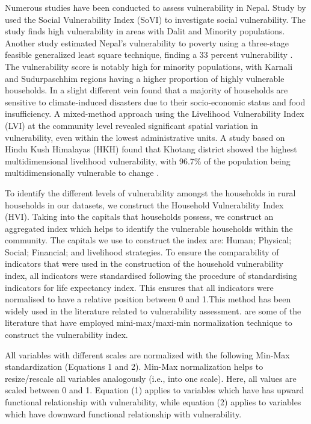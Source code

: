 Numerous studies have been conducted to assess vulnerability in Nepal. Study by \cite{aksha2019analysis} used the Social Vulnerability Index (SoVI) to investigate social vulnerability. The study finds high vulnerability in areas with Dalit and Minority populations. Another study estimated Nepal's vulnerability to poverty using a three-stage feasible generalized least square technique, finding a 33 percent vulnerability \citep{shahiestimating}. The vulnerability score is notably high for minority populations, with Karnali and Sudurpaschhim regions having a higher proportion of highly vulnerable households. In a slight different vein \cite{bista2019grasping} found that a majority of households are sensitive to climate-induced disasters due to their socio-economic status and food insufficiency. A mixed-method approach using the Livelihood Vulnerability Index (LVI) at the community level revealed significant spatial variation in vulnerability, even within the lowest administrative units. A study based on Hindu Kush Himalayas (HKH) found that Khotang district showed the highest multidimensional livelihood vulnerability, with 96.7\% of the population being multidimensionally vulnerable to change \citep{gerlitz2017multidimensional}.

To identify the different levels of vulnerability amongst the households in rural households in our datasets, we construct the Household Vulnerability Index (HVI). Taking into the capitals that households possess, we construct an aggregated index which helps to identify the vulnerable households within the community. The capitals we use to construct the index are: Human; Physical; Social; Financial; and livelihood strategies. To ensure the comparability of indicators that were used in the construction of the household vulnerability index, all indicators were standardised following the \citep{watkins2007human} procedure of standardising indicators for life expectancy index. This ensures that all indicators were normalised to have a relative position between 0 and 1.This method has been widely used in the literature related to vulnerability assessment. \cite{fang2016rural, antwi2013characterising, karunarathne2020developing, huynh2018multi, dumenu2020social} are some of the literature that have employed mini-max/maxi-min normalization technique to construct the vulnerability index.\par

All variables with different scales are normalized with the following Min-Max standardization (Equations 1 and 2). Min-Max normalization helps to resize/rescale all variables analogously (i.e., into one scale). Here, all values are scaled between 0 and 1. Equation (1) applies to variables which have has upward functional relationship with vulnerability, while equation (2) applies to variables which have downward functional relationship with vulnerability.\par  

